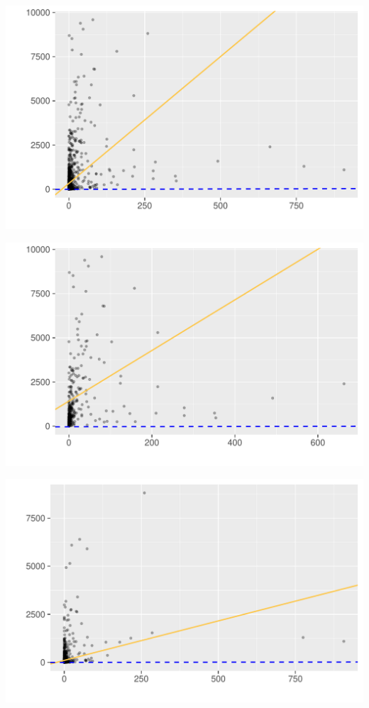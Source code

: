 \includegraphics[page=1,scale=0.7]{../hypotheses/h1_issue_comments_all.pdf}
\label{fig:hyp1_issuecomments_top_model_3}
\vspace{20 pt}
\begin{minipage}{.5\textwidth}
	\centering
	\includegraphics[page=1,scale=0.3]{../hypotheses/h1_issue_comments_top.pdf}
  \label{fig:hyp1_issuecomments_residual_model_3}
\end{minipage}
\begin{minipage}{.5\textwidth}
	\centering
	\includegraphics[page=1,scale=0.3]{../hypotheses/h1_issue_comments_residual.pdf}
  \label{fig:hyp1_issuecomments_residual_model_3}
\end{minipage}
